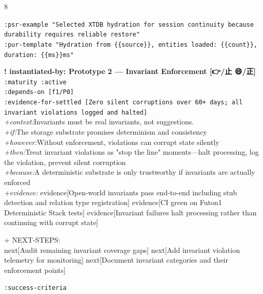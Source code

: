 \documentclass[landscape]{article}
\newcommand{\flexitag}[1]{\textcolor[gray]{0.35}{\textit{#1}}}
\newenvironment{devmapactive}{%
  \def\FrameCommand{\colorbox{devmapactivebg}}%
  \setlength{\fboxsep}{2pt}%
  \MakeFramed{\advance\hsize-\width \FrameRestore}%
}{\endMakeFramed}
\newenvironment{devmapsettled}{%
  \def\FrameCommand{\colorbox{devmapsettledbg}}%
  \setlength{\fboxsep}{2pt}%
  \MakeFramed{\advance\hsize-\width \FrameRestore}%
}{\endMakeFramed}
\begin{document}
\begin{paracol}{8}
\begin{devmapsettled}
\par
  \texttt{:\allowbreak{}psr-\allowbreak{}example "Selected XTDB hydration for session continuity because durability requires reliable restore"}\\
  \texttt{:\allowbreak{}pur-\allowbreak{}template "Hydration from \{\{source\}\},\allowbreak{} entities loaded:\allowbreak{} \{\{count\}\},\allowbreak{} duration:\allowbreak{} \{\{ms\}\}ms"}\\
\par
\par
\end{devmapsettled}
\begin{devmapactive}
\textbf{! instantiated-by: Prototype 2 — Invariant Enforcement [👉/止 😄/正]}\\
  \texttt{:\allowbreak{}maturity :\allowbreak{}active}\\
  \texttt{:\allowbreak{}depends-\allowbreak{}on [f1/\allowbreak{}P0]}\\
  \texttt{:\allowbreak{}evidence-\allowbreak{}for-\allowbreak{}settled [Zero silent corruptions over 60+\allowbreak{} days;\allowbreak{} all invariant violations logged and halted]}\\
  \flexitag{+context:}Invariants must be real invariants, not suggestions.\\
  \flexitag{+if:}The storage substrate promises determinism and consistency\\
  \flexitag{+however:}Without enforcement, violations can corrupt state silently\\
  \flexitag{+then:}Treat invariant violations as "stop the line" moments—halt processing, log the violation, prevent silent corruption\\
  \flexitag{+because:}A deterministic substrate is only trustworthy if invariants are actually enforced\\
  \flexitag{+evidence:} evidence[Open-world invariants pass end-to-end including stub detection and relation type registration] evidence[CI green on Futon1 Deterministic Stack tests] evidence[Invariant failures halt processing rather than continuing with corrupt state]\\
\par
  + NEXT-STEPS:\\
    next[Audit remaining invariant coverage gaps] next[Add invariant violation telemetry for monitoring] next[Document invariant categories and their enforcement points]\\
\par
  \texttt{:\allowbreak{}success-\allowbreak{}criteria}\\

\end{devmapactive}
\end{paracol}
\end{document}
